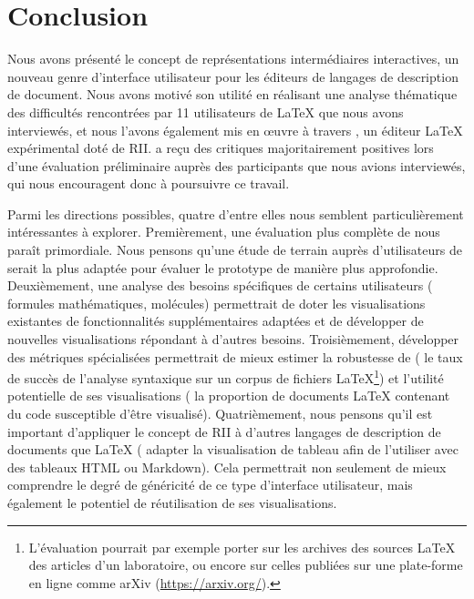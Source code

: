 \section{Conclusion}
\label{sec:conclusion}

Nous avons présenté le concept de représentations intermédiaires interactives, un nouveau genre d'interface utilisateur pour les éditeurs de langages de description de document.
Nous avons motivé son utilité en réalisant une analyse thématique des difficultés rencontrées par 11 utilisateurs de \LaTeX{} que nous avons interviewés, et nous l'avons également mis en œuvre à travers \iLaTeX{}, un éditeur \LaTeX{} expérimental doté de RII.
\iLaTeX{} a reçu des critiques majoritairement positives lors d'une évaluation préliminaire auprès des participants que nous avions interviewés, qui nous encouragent donc à poursuivre ce travail.

Parmi les directions possibles, quatre d'entre elles nous semblent particulièrement intéressantes à explorer.
Premièrement, une évaluation plus complète de \iLaTeX{} nous paraît primordiale.
Nous pensons qu'une étude de terrain auprès d'utilisateurs de \iLaTeX{} serait la plus adaptée pour évaluer le prototype de manière plus approfondie.
Deuxièmement, une analyse des besoins spécifiques de certains utilisateurs (\eg{} formules mathématiques, molécules) permettrait de doter les visualisations existantes de fonctionnalités supplémentaires adaptées et de développer de nouvelles visualisations répondant à d'autres besoins.
Troisièmement, développer des métriques spécialisées permettrait de mieux estimer la robustesse de \iLaTeX{} (\eg{} le taux de succès de l'analyse syntaxique sur un corpus de fichiers \LaTeX{}\footnote{L'évaluation pourrait par exemple porter sur les archives des sources \LaTeX{} des articles d'un laboratoire, ou encore sur celles publiées sur une plate-forme en ligne comme arXiv (\url{https://arxiv.org/}).}) et l'utilité potentielle de ses visualisations (\eg{} la proportion de documents \LaTeX{} contenant du code susceptible d'être visualisé).
Quatrièmement, nous pensons qu'il est important d'appliquer le concept de RII à d'autres langages de description de documents que \LaTeX{} (\eg{} adapter la visualisation de tableau afin de l'utiliser avec des tableaux HTML ou Markdown).
Cela permettrait non seulement de mieux comprendre le degré de généricité de ce type d'interface utilisateur, mais également le potentiel de réutilisation de ses visualisations.